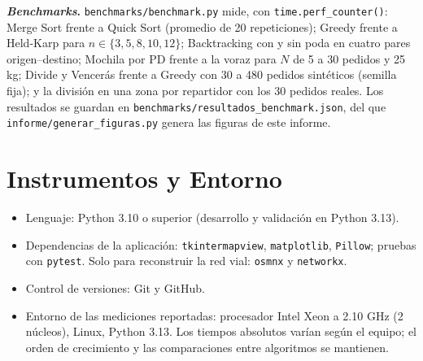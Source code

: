 \textbf{\textit{Benchmarks}.} \texttt{benchmarks/benchmark.py} mide, con \texttt{time.perf\_counter()}: Merge Sort frente a Quick Sort (promedio de 20 repeticiones); Greedy frente a Held-Karp para $n\in\{3,5,8,10,12\}$; Backtracking con y sin poda en cuatro pares origen--destino; Mochila por PD frente a la voraz para $N$ de 5 a 30 pedidos y 25 kg; Divide y Vencerás frente a Greedy con 30 a 480 pedidos sintéticos (semilla fija); y la división en una zona por repartidor con los 30 pedidos reales. Los resultados se guardan en \texttt{benchmarks/resultados\_benchmark.json}, del que \texttt{informe/generar\_figuras.py} genera las figuras de este informe.

\section{Instrumentos y Entorno}

\begin{itemize}
    \item Lenguaje: Python 3.10 o superior (desarrollo y validación en Python 3.13).
    \item Dependencias de la aplicación: \texttt{tkintermapview}, \texttt{matplotlib}, \texttt{Pillow}; pruebas con \texttt{pytest}. Solo para reconstruir la red vial: \texttt{osmnx} y \texttt{networkx}.
    \item Control de versiones: Git y GitHub.
    \item Entorno de las mediciones reportadas: procesador Intel Xeon a 2.10 GHz (2 núcleos), Linux, Python 3.13. Los tiempos absolutos varían según el equipo; el orden de crecimiento y las comparaciones entre algoritmos se mantienen.
\end{itemize}
